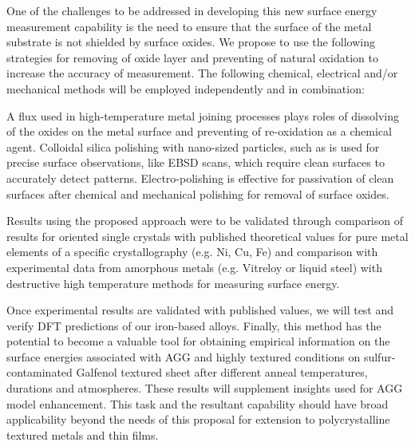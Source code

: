 One of the challenges to be addressed in developing this new surface energy measurement capability is the need to ensure that the surface of the metal substrate is not shielded by surface oxides. We propose to use the following strategies for removing of oxide layer and preventing of natural oxidation to increase the accuracy of measurement. The following chemical, electrical and/or mechanical methods will be employed independently and in combination:
\begin{outline}
	\1 A flux used in high-temperature metal joining processes plays roles of dissolving of the oxides on the metal surface and preventing of re-oxidation as a chemical agent.
	\1 Colloidal silica polishing with nano-sized particles, such as is used for precise surface observations, like EBSD scans, which require clean surfaces to accurately detect patterns.
	\1 Electro-polishing is effective for passivation of clean surfaces after chemical and mechanical polishing for removal of surface oxides. 
\end{outline}
Results using the proposed approach were to be validated through comparison of results for oriented single crystals with published theoretical values for pure metal elements of a specific crystallography (e.g. Ni, Cu, Fe)  and comparison with experimental data from amorphous metals (e.g. Vitreloy or liquid steel) with destructive high temperature methods for measuring surface energy. 

Once experimental results are validated with published values, we will test and verify DFT predictions of our iron-based alloys. Finally, this method has the potential to become a valuable tool for obtaining empirical information on the surface energies associated with AGG and highly textured conditions on sulfur-contaminated Galfenol textured sheet after different anneal temperatures, durations and atmospheres. These results will supplement insights used for AGG model enhancement. This task and the resultant capability should have broad applicability beyond the needs of this proposal for extension to polycrystalline textured metals and thin films.




